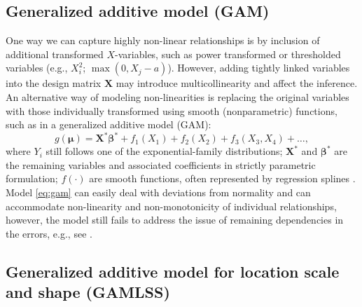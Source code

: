 \documentclass[
]{book}
\begin{document}
\hypertarget{generalized-additive-model-gam}{%
\subsection{Generalized additive model (GAM)}\label{generalized-additive-model-gam}}

One way we can capture highly non-linear relationships is by inclusion of additional transformed \(X\)-variables, such as power transformed or thresholded variables (e.g., \(X_i^2\); \(\max(0, X_j - a)\)). However, adding tightly linked variables into the design matrix \(\mathbf{X}\) may introduce multicollinearity and affect the inference. An alternative way of modeling non-linearities is replacing the original variables with those individually transformed using smooth (nonparametric) functions, such as in a generalized additive model (GAM):
\begin{equation}
    \label{eq:gam}
    g(\boldsymbol{\mu}) = \mathbf{X}^*\boldsymbol{\beta}^* + f_1(X_1) + f_2(X_2) + f_3(X_3,X_4) + \ldots,
\end{equation}
where \(Y_i\) still follows one of the exponential-family distributions; \(\mathbf{X}^*\) and \(\boldsymbol{\beta}^*\) are the remaining variables and associated coefficients in strictly parametric formulation; \(f(\cdot)\) are smooth functions, often represented by regression splines \citep{Wood:2006book}. Model \eqref{eq:gam} can easily deal with deviations from normality and can accommodate non-linearity and non-monotonicity of individual relationships, however, the model still fails to address the issue of remaining dependencies in the errors, e.g., see \citet{Kohn:etal:2000}.

\hypertarget{generalized-additive-model-for-location-scale-and-shape-gamlss}{%
\subsection{Generalized additive model for location scale and shape (GAMLSS)}\label{generalized-additive-model-for-location-scale-and-shape-gamlss}}
\end{document}
